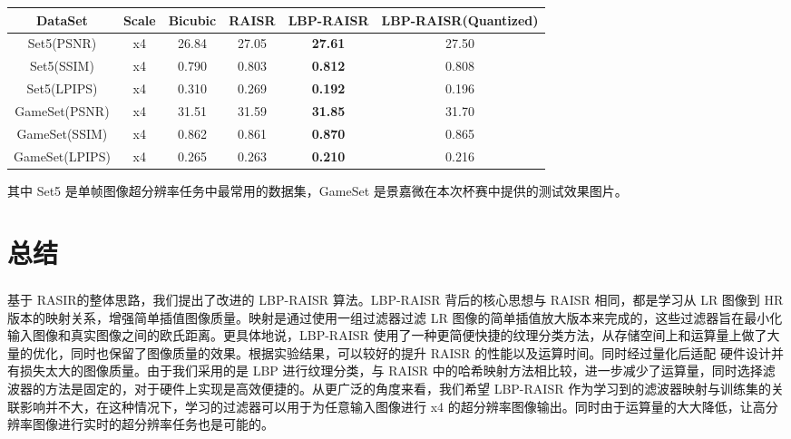 \documentclass[12pt, a4paper, oneside]{ctexbook}
\begin{document}
	\newcommand{\Rown}{\stepcounter{Rownumber}\theRownumber}
	\begin{tabular}{|c|c|c|c|c|c|}\hline
	 DataSet 				& Scale & Bicubic 	& RAISR & LBP-RAISR 		& LBP-RAISR(Quantized) 	\\\hline
	 \Rown Set5(PSNR) 		& x4 	& 26.84 	& 27.05 & \textbf{27.61} 	& 27.50 				\\\hline
	 \Rown Set5(SSIM) 		& x4 	& 0.790	 	& 0.803 & \textbf{0.812} 	& 0.808 				\\\hline
	 \Rown Set5(LPIPS) 		& x4 	& 0.310 	& 0.269 & \textbf{0.192} 	& 0.196 				\\\hline
	 \Rown GameSet(PSNR) 	& x4 	& 31.51 	& 31.59 & \textbf{31.85} 	& 31.70 				\\\hline
	 \Rown GameSet(SSIM) 	& x4 	& 0.862 	& 0.861 & \textbf{0.870} 	& 0.865 				\\\hline
	 \Rown GameSet(LPIPS) 	& x4 	& 0.265 	& 0.263 & \textbf{0.210} 	& 0.216 				\\\hline
	\end{tabular}
	其中 Set5 是单帧图像超分辨率任务中最常用的数据集，GameSet 是景嘉微在本次杯赛中提供的测试效果图片。
	
	\chapter{总结}
	基于 RASIR\textsuperscript{\cite{1}}的整体思路，我们提出了改进的 LBP-RAISR 算法。LBP-RAISR 背后的核心思想与 RAISR 相同，都是学习从 LR 图像到 HR 版本的映射关系，增强简单插值图像质量。映射是通过使用一组过滤器过滤 LR 图像的简单插值放大版本来完成的，这些过滤器旨在最小化输入图像和真实图像之间的欧氏距离。更具体地说，LBP-RAISR 使用了一种更简便快捷的纹理分类方法，从存储空间上和运算量上做了大量的优化，同时也保留了图像质量的效果。根据实验结果，可以较好的提升 RAISR 的性能以及运算时间。同时经过量化后适配 硬件设计并有损失太大的图像质量。由于我们采用的是 LBP 进行纹理分类，与 RAISR 中的哈希映射方法相比较，进一步减少了运算量，同时选择滤波器的方法是固定的，对于硬件上实现是高效便捷的。从更广泛的角度来看，我们希望 LBP-RAISR 作为学习到的滤波器映射与训练集的关联影响并不大，在这种情况下，学习的过滤器可以用于为任意输入图像进行 x4 的超分辨率图像输出。同时由于运算量的大大降低，让高分辨率图像进行实时的超分辨率任务也是可能的。
\end{document}
